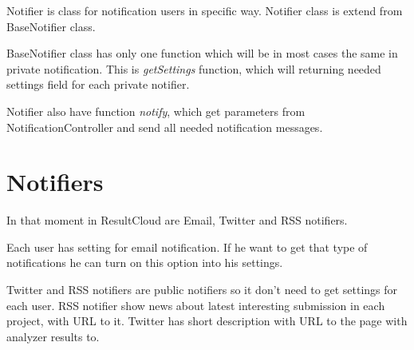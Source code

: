 Notifier is class for notification users in specific way. Notifier class is extend from BaseNotifier class.

BaseNotifier class has only one function which will be in most cases the same in private notification. This is \emph{getSettings} function, which will returning needed settings field for each private notifier. 

Notifier also have function \emph{notify}, which get parameters from NotificationController and send all needed notification messages.

\chapter{Notifiers}

In that moment in ResultCloud are Email, Twitter and RSS notifiers.

Each user has setting for email notification. If he want to get that type of notifications he can turn on this option into his settings. 

Twitter and RSS notifiers are public notifiers so it don't need to get settings for each user. RSS notifier show news about latest interesting submission in each project, with URL to it. Twitter has short description with URL to the page with analyzer results to.
